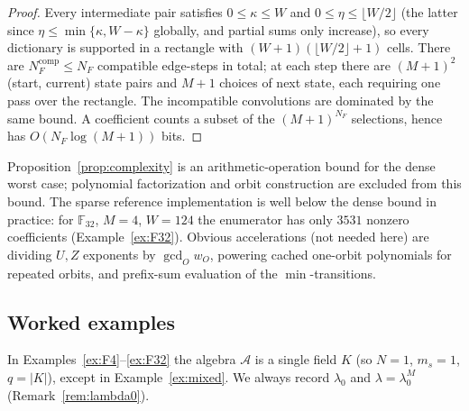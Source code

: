 \documentclass[11pt,a4paper]{article}
\newcommand{\F}{\mathbb F}
\newcommand{\A}{\mathcal A}
\numberwithin{equation}{section}
\theoremstyle{plain}
\theoremstyle{definition}
\theoremstyle{remark}
\begin{document}
\begin{proof}
Every intermediate pair satisfies $0\leq\kappa\leq W$ and
$0\leq\eta\leq\lfloor W/2\rfloor$ (the latter since
$\eta\leq\min\{\kappa,W-\kappa\}$ globally, and partial sums only increase),
so every dictionary is supported in a rectangle with
$(W+1)(\lfloor W/2\rfloor+1)$ cells.  There are $N_F^{\mathrm{comp}}\leq N_F$
compatible edge-steps in total; at each step there are $(M+1)^2$
(start, current) state pairs and $M+1$ choices of next state, each requiring
one pass over the rectangle.  The incompatible convolutions are dominated by
the same bound.  A coefficient counts a subset of the $(M+1)^{N_F}$
selections, hence has $O(N_F\log(M+1))$ bits.
\end{proof}

Proposition~\ref{prop:complexity} is an arithmetic-operation bound for the
dense worst case; polynomial factorization and orbit construction are
excluded from this bound.  The sparse reference
implementation is well below the dense bound in practice: for
$\F_{32}$, $M=4$, $W=124$ the enumerator has only $3531$ nonzero coefficients
(Example~\ref{ex:F32}).  Obvious accelerations (not needed here) are dividing
$U,Z$ exponents by $\gcd_O w_O$, powering cached one-orbit polynomials for
repeated orbits, and prefix-sum evaluation of the $\min$-transitions.

\subsection{Worked examples}\label{sec:worked}

In Examples~\ref{ex:F4}--\ref{ex:F32} the algebra $\A$ is a single field $K$
(so $N=1$, $m_s=1$, $q=|K|$), except in Example~\ref{ex:mixed}.  We always
record $\lambda_0$ and $\lambda=\lambda_0^M$
(Remark~\ref{rem:lambda0}).
\end{document}
